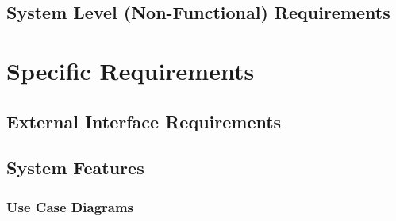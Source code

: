 \documentclass[12pt, oneside, letterpaper]{report}
\begin{document}
	\section{System Level (Non-Functional) Requirements}
		
\chapter{Specific Requirements}
	\section{External Interface Requirements}
		
	\section{System Features}
		\subsection{Use Case Diagrams}
		
		
		
		
		
		
		

\end{document}
